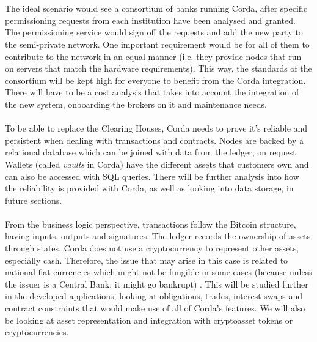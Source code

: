 \documentclass[12pt,twoside]{article}
\begin{document}
\\ \\
The ideal scenario would see a consortium of banks running Corda, after specific permissioning requests from each institution have been analysed and granted. The permissioning service would sign off the requests and add the new party to the semi-private network. One important requirement would be for all of them to contribute to the network in an equal manner (i.e. they provide nodes that run on servers that match the hardware requirements). This way, the standards of the consortium will be kept high for everyone to benefit from the Corda integration. There will have to be a cost analysis that takes into account the integration of the new system, onboarding the brokers on it and maintenance needs. 
\\ \\
To be able to replace the Clearing Houses, Corda needs to prove it's reliable and persistent when dealing with transactions and contracts. Nodes are backed by a relational database which can be joined with data from the ledger, on request. Wallets (called \textit{vaults} in Corda) have the different assets that customers own and can also be accessed with SQL queries.  There will be further analysis into how the reliability is provided with Corda, as well as looking into data storage, in future sections. 
\\ \\
From the business logic perspective, transactions follow the Bitcoin structure, having inputs, outputs and signatures. The ledger records the ownership of assets through states. Corda does not use a cryptocurrency to represent other assets, especially cash. Therefore, the issue that may arise in this case is related to national fiat currencies which might not be fungible in some cases (because unless the issuer is a Central Bank, it might go bankrupt) \cite{Corda:TP}. This will be studied further in the developed applications, looking at obligations, trades, interest swaps and contract constraints that would make use of all of Corda's features. We will also be looking at asset representation and integration with cryptoasset tokens or cryptocurrencies.
\\ \\
\end{document}
